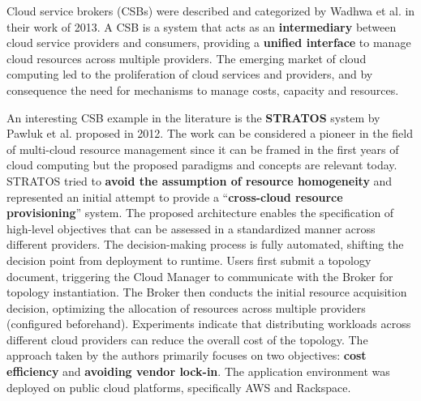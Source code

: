 Cloud service brokers (CSBs) were described and categorized by Wadhwa et al. \cite{Wadhwa_2013} in their work of 2013.
A CSB is a system that acts as an \textbf{intermediary} between cloud service providers and consumers, providing a \textbf{unified interface} to manage cloud resources across multiple providers.
The emerging market of cloud computing led to the proliferation of cloud services and providers, and by consequence the need for mechanisms to manage costs, capacity and resources. 
\newline

An interesting CSB example in the literature is the \textbf{STRATOS} system by Pawluk et al. \cite{STRATOS} proposed in 2012. 
The work can be considered a pioneer in the field of multi-cloud resource management since it can be framed in the first years of cloud computing but the proposed paradigms and concepts are relevant today.
STRATOS tried to \textbf{avoid the assumption of resource homogeneity} and represented an initial attempt to provide a ``\textbf{cross-cloud resource provisioning}'' system.
The proposed architecture enables the specification of high-level objectives that can be assessed in a standardized manner across different providers. The decision-making process is fully automated, shifting the decision point from deployment to runtime.
Users first submit a topology document, triggering the Cloud Manager to communicate with the Broker for topology instantiation. The Broker then conducts the initial resource acquisition decision, optimizing the allocation of resources across multiple providers (configured beforehand).
Experiments indicate that distributing workloads across different cloud providers can reduce the overall cost of the topology. The approach taken by the authors primarily focuses on two objectives: \textbf{cost efficiency} and \textbf{avoiding vendor lock-in}. The application environment was deployed on public cloud platforms, specifically AWS and Rackspace.
\newline

